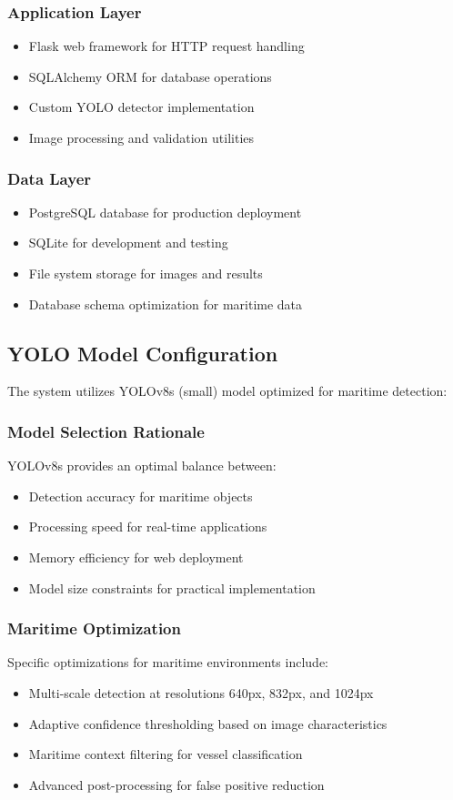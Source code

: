 \documentclass[a4paper,11pt]{article}
\begin{document}
\subsubsection{Application Layer}
\begin{itemize}
    \item Flask web framework for HTTP request handling
    \item SQLAlchemy ORM for database operations
    \item Custom YOLO detector implementation
    \item Image processing and validation utilities
\end{itemize}

\subsubsection{Data Layer}
\begin{itemize}
    \item PostgreSQL database for production deployment
    \item SQLite for development and testing
    \item File system storage for images and results
    \item Database schema optimization for maritime data
\end{itemize}

\subsection{YOLO Model Configuration}
The system utilizes YOLOv8s (small) model optimized for maritime detection:

\subsubsection{Model Selection Rationale}
YOLOv8s provides an optimal balance between:
\begin{itemize}
    \item Detection accuracy for maritime objects
    \item Processing speed for real-time applications
    \item Memory efficiency for web deployment
    \item Model size constraints for practical implementation
\end{itemize}

\subsubsection{Maritime Optimization}
Specific optimizations for maritime environments include:
\begin{itemize}
    \item Multi-scale detection at resolutions 640px, 832px, and 1024px
    \item Adaptive confidence thresholding based on image characteristics
    \item Maritime context filtering for vessel classification
    \item Advanced post-processing for false positive reduction
\end{itemize}
\end{document}
